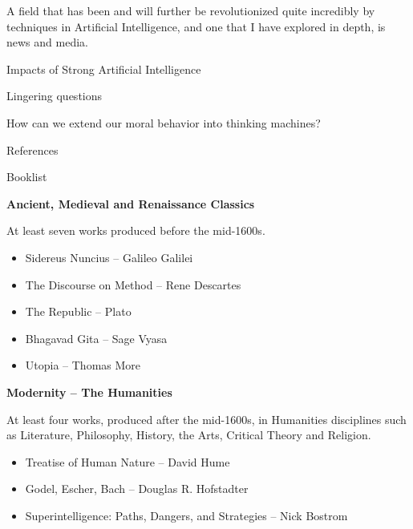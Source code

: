 \documentclass[11pt]{article}
\begin{document}
\par A field that has been and will further be revolutionized quite incredibly by techniques in Artificial Intelligence, and one that I have explored in depth, is news and media.

\begin{center}
	{\large Impacts of Strong Artificial Intelligence\par}
\end{center}

\par 

\begin{center}
	{\large Lingering questions\par}
\end{center}

\par How can we extend our moral behavior into thinking machines?

\begin{center}
	{\large References\par}
\end{center}

\newpage

{\Large Booklist\\\par}

\par \textbf{Ancient, Medieval and Renaissance Classics}
\par At least seven works produced before the mid-1600s.
\begin{itemize}
	\item Sidereus Nuncius ­-- Galileo Galilei
	\item The Discourse on Method -- Rene Descartes
	\item The Republic -- Plato
	\item Bhagavad Gita -- Sage Vyasa
	\item Utopia -- Thomas More
\end{itemize}

\par \textbf{Modernity -- The Humanities}
\par At least four works, produced after the mid-1600s, in Humanities disciplines such as Literature, Philosophy, History, the Arts, Critical Theory and Religion.
\begin{itemize}
	\item Treatise of Human Nature -- David Hume
	\item Godel, Escher, Bach -- Douglas R. Hofstadter
	\item Superintelligence: Paths, Dangers, and Strategies -- Nick Bostrom
\end{itemize}
\end{document}
